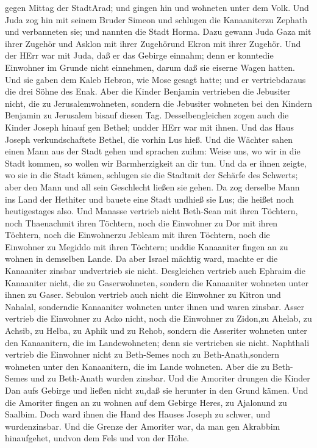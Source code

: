 gegen Mittag der StadtArad; und gingen hin und wohneten unter dem Volk.
 Und Juda zog hin mit seinem Bruder Simeon und schlugen die
Kanaaniterzu Zephath und verbanneten sie; und nannten die Stadt Horma.
 Dazu gewann Juda Gaza mit ihrer Zugehör und Asklon mit
ihrer Zugehörund Ekron mit ihrer Zugehör.  Und der HErr war
mit Juda, daß er das Gebirge einnahm; denn er konntedie Einwohner im
Grunde nicht einnehmen, darum daß sie eiserne Wagen hatten.
 Und sie gaben dem Kaleb Hebron, wie Mose gesagt hatte; und
er vertriebdaraus die drei Söhne des Enak.  Aber die Kinder
Benjamin vertrieben die Jebusiter nicht, die zu Jerusalemwohneten,
sondern die Jebusiter wohneten bei den Kindern Benjamin zu Jerusalem
bisauf diesen Tag.  Desselbengleichen zogen auch die Kinder
Joseph hinauf gen Bethel; undder HErr war mit ihnen.  Und
das Haus Joseph verkundschaftete Bethel, die vorhin Lus hieß.
 Und die Wächter sahen einen Mann aus der Stadt gehen und
sprachen zuihm: Weise uns, wo wir in die Stadt kommen, so wollen wir
Barmherzigkeit an dir tun.  Und da er ihnen zeigte, wo sie
in die Stadt kämen, schlugen sie die Stadtmit der Schärfe des Schwerts;
aber den Mann und all sein Geschlecht ließen sie gehen.  Da
zog derselbe Mann ins Land der Hethiter und bauete eine Stadt undhieß
sie Lus; die heißet noch heutigestages also.  Und Manasse
vertrieb nicht Beth-Sean mit ihren Töchtern, noch Thaenachmit ihren
Töchtern, noch die Einwohner zu Dor mit ihren Töchtern, noch die
Einwohnerzu Jebleam mit ihren Töchtern, noch die Einwohner zu Megiddo
mit ihren Töchtern; unddie Kanaaniter fingen an zu wohnen in demselben
Lande.  Da aber Israel mächtig ward, machte er die
Kanaaniter zinsbar undvertrieb sie nicht.  Desgleichen
vertrieb auch Ephraim die Kanaaniter nicht, die zu Gaserwohneten,
sondern die Kanaaniter wohneten unter ihnen zu Gaser. 
Sebulon vertrieb auch nicht die Einwohner zu Kitron und Nahalal,
sonderndie Kanaaniter wohneten unter ihnen und waren zinsbar.
 Asser vertrieb die Einwohner zu Acko nicht, noch die
Einwohner zu Zidon,zu Ahelab, zu Achsib, zu Helba, zu Aphik und zu
Rehob,  sondern die Asseriter wohneten unter den
Kanaanitern, die im Landewohneten; denn sie vertrieben sie nicht.
 Naphthali vertrieb die Einwohner nicht zu Beth-Semes noch
zu Beth-Anath,sondern wohneten unter den Kanaanitern, die im Lande
wohneten. Aber die zu Beth-Semes und zu Beth-Anath wurden zinsbar.
 Und die Amoriter drungen die Kinder Dan aufs Gebirge und
ließen nicht zu,daß sie herunter in den Grund kämen.  Und
die Amoriter fingen an zu wohnen auf dem Gebirge Heres, zu Ajalonund zu
Saalbim. Doch ward ihnen die Hand des Hauses Joseph zu schwer, und
wurdenzinsbar.  Und die Grenze der Amoriter war, da man gen
Akrabbim hinaufgehet, undvon dem Fels und von der Höhe.

